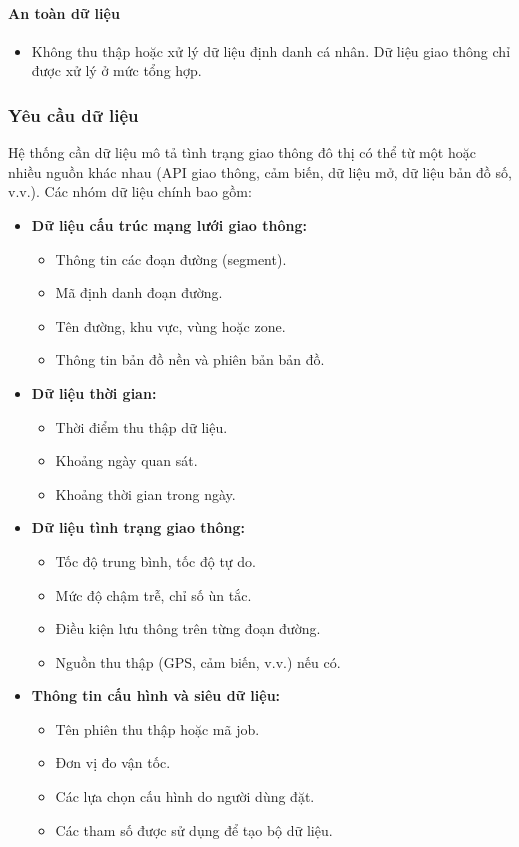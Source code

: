 \paragraph{An toàn dữ liệu}
\begin{itemize}
    \item Không thu thập hoặc xử lý dữ liệu định danh cá nhân. Dữ liệu giao thông chỉ được xử lý ở mức tổng hợp.
\end{itemize}
\subsubsection{Yêu cầu dữ liệu}

Hệ thống cần dữ liệu mô tả tình trạng giao thông đô thị có thể từ một hoặc nhiều nguồn khác nhau (API giao thông, cảm biến, dữ liệu mở, dữ liệu bản đồ số, v.v.). Các nhóm dữ liệu chính bao gồm:
\begin{itemize}
    \item \textbf{Dữ liệu cấu trúc mạng lưới giao thông:}
    \begin{itemize}
        \item Thông tin các đoạn đường (segment).
        \item Mã định danh đoạn đường.
        \item Tên đường, khu vực, vùng hoặc zone.
        \item Thông tin bản đồ nền và phiên bản bản đồ.
    \end{itemize}

    \item \textbf{Dữ liệu thời gian:}
    \begin{itemize}
        \item Thời điểm thu thập dữ liệu.
        \item Khoảng ngày quan sát.
        \item Khoảng thời gian trong ngày.
    \end{itemize}

    \item \textbf{Dữ liệu tình trạng giao thông:}
    \begin{itemize}
        \item Tốc độ trung bình, tốc độ tự do.
        \item Mức độ chậm trễ, chỉ số ùn tắc.
        \item Điều kiện lưu thông trên từng đoạn đường.
        \item Nguồn thu thập (GPS, cảm biến, v.v.) nếu có.
    \end{itemize}

    \item \textbf{Thông tin cấu hình và siêu dữ liệu:}
    \begin{itemize}
        \item Tên phiên thu thập hoặc mã job.
        \item Đơn vị đo vận tốc.
        \item Các lựa chọn cấu hình do người dùng đặt.
        \item Các tham số được sử dụng để tạo bộ dữ liệu.
    \end{itemize}
\end{itemize}

